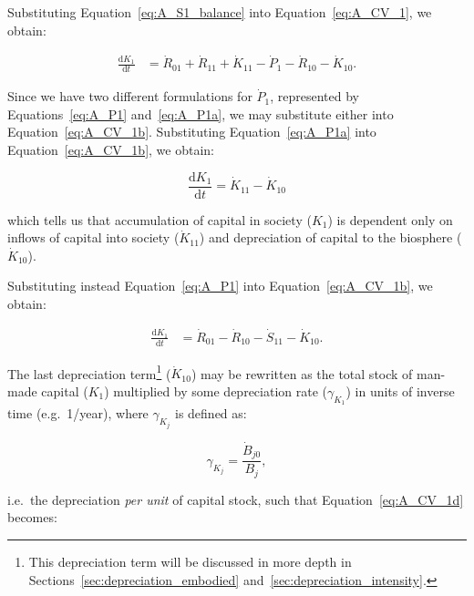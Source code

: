 

Substituting Equation~\ref{eq:A_S1_balance} 
into Equation~\ref{eq:A_CV_1}, we obtain:

\begin{align}\label{eq:A_CV_1b}
	\frac{\mathrm{d}K_{1}}{\mathrm{d}t}		&
	= \dot{R}_{01} 
	+ \dot{R}_{11}
	+ \dot{K}_{11}
	- \dot{P}_{1}				
	- \dot{R}_{10}				
	- \dot{K}_{10}.
\end{align}

Since we have two different formulations for $\dot{P}_{1}$,
represented by Equations~\ref{eq:A_P1} and~\ref{eq:A_P1a}, 
we may substitute either into Equation~\ref{eq:A_CV_1b}.
Substituting Equation~\ref{eq:A_P1a} 
into Equation~\ref{eq:A_CV_1b}, we obtain:

\begin{equation}\label{eq:A_CV_1c}
	\frac{\mathrm{d}K_{1}}{\mathrm{d}t}		
	= \dot{K}_{11}
	- \dot{K}_{10}
\end{equation}

\noindent{}which tells us that accumulation of capital in society 
($K_{1}$) is dependent only on inflows of capital into society ($\dot{K}_{11}$) 
and depreciation of capital to the biosphere ($\dot{K}_{10}$).

Substituting instead Equation~\ref{eq:A_P1} 
into Equation~\ref{eq:A_CV_1b}, we obtain:

 \begin{align}\label{eq:A_CV_1d}
	\frac{\mathrm{d}K_{1}}{\mathrm{d}t}		&
	= \dot{R}_{01} 
	- \dot{R}_{10}
	- \dot{S}_{11}
	- \dot{K}_{10}.
\end{align}

The last depreciation term\footnote{This
depreciation term will be discussed in more depth in
Sections~\ref{sec:depreciation_embodied} and~\ref{sec:depreciation_intensity}.} 
($\dot{K}_{10}$)
may be rewritten as the total stock
of man-made capital ($K_{1}$) 
multiplied by some depreciation rate ($\gamma_{K_{1}}$)
in units of inverse time (e.g.\ 1/year),
where $\gamma_{K_{j}}$ is defined as:

\begin{equation}\label{eq:def_gamma}
\gamma_{K_{j}} = \frac{\dot{B}_{j0}}{B_{j}},
\end{equation}

\noindent{}i.e.\ the depreciation \emph{per unit}
of capital stock,
such that Equation~\ref{eq:A_CV_1d} becomes:

